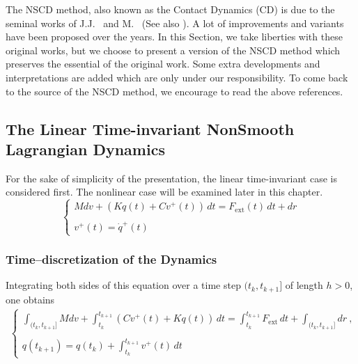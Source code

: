 The NSCD method, also known as the Contact Dynamics (CD) is due to the seminal works of J.J.~\cite{Moreau1983,Moreau1985,Moreau1988,Moreau1994,Moreau1999} and M.~\cite{Jean88,Jean1999}  (See also \citep{Jean.Pratt85,Jean.Moreau91,Jean.Moreau92}). A lot of improvements and variants have been proposed over the years. In this Section,  we take  liberties with these original works, but we  choose to present a version of the NSCD method which preserves the essential of the original work. Some  extra developments and interpretations are added which are only under our responsibility. To come back to the source of the NSCD method, we encourage to read the above references.

\subsection{The Linear Time-invariant NonSmooth Lagrangian Dynamics}
\label{section11.1.1}



 For the sake of simplicity of the presentation, the linear time-invariant case is considered first. The nonlinear case will be examined later in this chapter.
\begin{equation}
  \label{eq:11-a}
  \begin{cases}
    M dv + (K q(t) + C v^+(t))\,dt = F_{\mathrm{ext}}(t)\,dt + dr  \\ \\
    v^+(t)=\dot{q}^+(t)
  \end{cases}
\end{equation}


\subsubsection{Time--discretization of the Dynamics}


Integrating both sides of this equation over a time step $(t_k,t_{k+1}]$ of length $h>0$, one obtains
\begin{eqnarray}
  \begin{cases}
    \displaystyle \int_{(t_k,t_{k+1}]} M dv + \int_{t_k}^{t_{k+1}} (C v^+(t)
      + K q(t)) \,dt = \displaystyle \int_{t_k}^{t_{k+1}} F_{\mathrm{ext}}\,dt +
        \displaystyle \int_{(t_k,t_{k+1}]} dr \:, \\ \\
     q(t_{k+1}) = q(t_{k}) + \displaystyle \int_{t_k}^{t_{k+1}} v^+(t)\,dt
   \end{cases}
\end{eqnarray}

